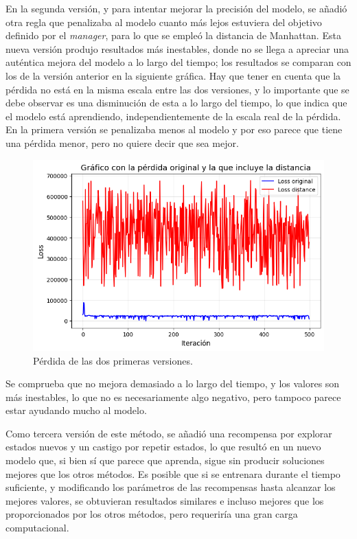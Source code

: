 \documentclass[letterpaper]{article} %
\begin{document}
En la segunda versión, y para intentar mejorar la precisión del modelo, se añadió otra regla que penalizaba al modelo cuanto más lejos estuviera del objetivo definido por el \textit{manager}, para lo que se empleó la distancia de Manhattan. Esta nueva versión 
produjo resultados más inestables, donde no se llega a apreciar una auténtica mejora del modelo a lo largo del tiempo; los resultados se comparan con los de la versión anterior en la siguiente gráfica. Hay que tener en cuenta que la pérdida no está
en la misma escala entre las dos versiones, y lo importante que se debe observar es una disminución de esta a lo largo del tiempo, lo que indica que el modelo está aprendiendo, independientemente de la escala real de la pérdida. En la primera versión se 
penalizaba menos al modelo y por eso parece que tiene una pérdida menor, pero no quiere decir que sea mejor.

\begin{figure}[H]
    \centering
    \includegraphics[width=0.9\columnwidth]{FuN_2.png}
    \caption{Pérdida de las dos primeras versiones.\label{fig:FuN4}}
\end{figure}

Se comprueba que no mejora demasiado a lo largo del tiempo, y los valores son más inestables, lo que no es necesariamente algo negativo, pero tampoco parece estar ayudando mucho al modelo.

Como tercera versión de este método, se añadió una recompensa por explorar estados nuevos y un castigo por repetir estados, lo que resultó en un nuevo modelo que, si bien sí que parece que aprenda, sigue sin producir soluciones mejores que los otros métodos. Es posible que si se entrenara durante el 
tiempo suficiente, y modificando los parámetros de las recompensas hasta alcanzar los mejores valores, se obtuvieran resultados similares e incluso mejores que los proporcionados por los otros métodos, pero requeriría una gran carga computacional.
\end{document}
